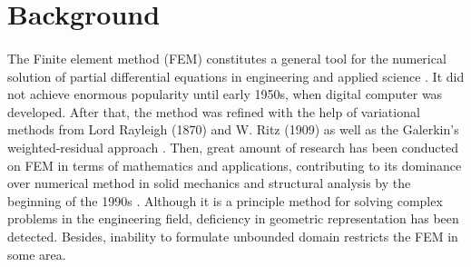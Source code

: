 \section{Background}
\paragraph{}
The Finite element method (FEM) constitutes a general tool for the numerical solution of partial differential equations in engineering and applied science \citep{Ucb2010}.
It did not achieve enormous popularity until early 1950s, when digital computer was developed.
After that, the method was refined with the help of variational methods from Lord Rayleigh (1870) and W. Ritz (1909) as well as the Galerkin's weighted-residual approach \citep{Fel1994}.
Then, great amount of research has been conducted on FEM in terms of mathematics and applications, contributing to its dominance over numerical method in solid mechanics and structural analysis by the beginning of the 1990s \citep{Clo1980}.
Although it is a principle method for solving complex problems in the engineering field, deficiency in geometric representation has been detected.
Besides, inability to formulate unbounded domain restricts the FEM in some area.

